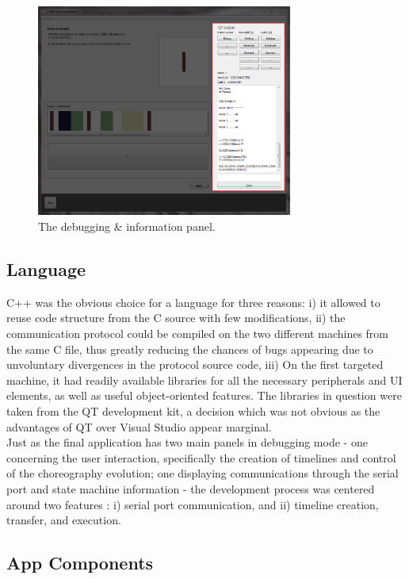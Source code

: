 \begin{figure}[ht]
   \centering
   \includegraphics[width=0.75\textwidth]{img/DebugPanel.png}
   \caption{The debugging \& information panel.}
   \label{img:DebugPanel}
\end{figure}

\subsection{Language}

C++ was the obvious choice for a language for three reasons: i) it allowed to reuse code structure from the C source with few modifications, ii) the communication protocol could be compiled on the two different machines from the same C file, thus greatly reducing the chances of bugs appearing due to unvoluntary divergences in the protocol source code, iii) On the first targeted machine, it had readily available libraries for all the necessary peripherals and UI elements, as well as useful object-oriented features. 
The libraries in question were taken from the QT development kit, a decision which was not obvious as the advantages of QT over Visual Studio appear marginal. \\

Just as the final application has two main panels in debugging mode - one concerning the user interaction, specifically the creation of timelines and control of the choreography evolution; one displaying communications through the serial port and state machine information - the development process was centered around two features : i) serial port communication, and ii) timeline creation, transfer, and execution. 

\subsection{App Components}

